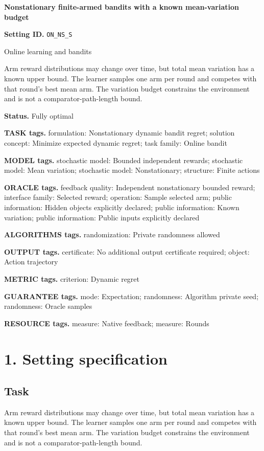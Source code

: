 \documentclass[10pt,a4paper]{article}
\begin{document}
\raggedright

{\LARGE\bfseries\sffamily\color{AtlasNavy} Nonstationary finite-armed bandits with a known mean-variation budget\par}\vspace{5pt}
\textbf{Setting ID.} \texttt{ON\_\allowbreak{}NS\_\allowbreak{}S}

Online learning and bandits

Arm reward distributions may change over time, but total mean variation has a known upper bound. The learner samples one arm per round and competes with that round's best mean arm. The variation budget constrains the environment and is not a comparator-path-length bound.

\textbf{Status.} Fully optimal

\textbf{TASK tags.} formulation: Nonstationary dynamic bandit regret; solution concept: Minimize expected dynamic regret; task family: Online bandit

\textbf{MODEL tags.} stochastic model: Bounded independent rewards; stochastic model: Mean variation; stochastic model: Nonstationary; structure: Finite actions

\textbf{ORACLE tags.} feedback quality: Independent nonstationary bounded reward; interface family: Selected reward; operation: Sample selected arm; public information: Hidden objects explicitly declared; public information: Known variation; public information: Public inputs explicitly declared

\textbf{ALGORITHMS tags.} randomization: Private randomness allowed

\textbf{OUTPUT tags.} certificate: No additional output certificate required; object: Action trajectory

\textbf{METRIC tags.} criterion: Dynamic regret

\textbf{GUARANTEE tags.} mode: Expectation; randomness: Algorithm private seed; randomness: Oracle samples

\textbf{RESOURCE tags.} measure: Native feedback; measure: Rounds

\section{1. Setting specification}
\subsection{Task}
Arm reward distributions may change over time, but total mean variation has a known upper bound. The learner samples one arm per round and competes with that round's best mean arm. The variation budget constrains the environment and is not a comparator-path-length bound.
\end{document}
